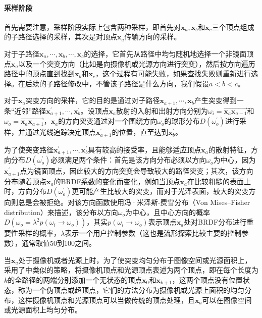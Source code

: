 \paragraph{采样阶段}
首先需要注意，采样阶段实际上包含两种采样，即首先对$\mathbf{x}_a,\mathbf{x}_b$和$\mathbf{x}_c$三个顶点组成的子路径选择的采样，其次是对顶点$\mathbf{x}_a$传输方向的采样。

对于子路径$\mathbf{x}_a,\cdots,\mathbf{x}_b,\cdots,\mathbf{x}_c$的选择，它首先从路径中均匀随机地选择一个非镜面顶点$\mathbf{x}_a$以及一个突变方向（比如是向摄像机或光源方向进行突变），然后按方向遍历路径中的顶点直到找到$\mathbf{x}_b$和$\mathbf{x}_c$，这个过程有可能失败，如果查找失败则重新进行选择。在后续的子路径修改中，不管该子路径是什么方向，我们假设$a<b<c$。

对于$\mathbf{x}_a$突变方向的采样，它的目的是通过对子路径$\mathbf{x}_{a+1},\cdots,\mathbf{x}_b$产生突变得到一条“近邻”路径$\mathbf{x}^{'}_{a+1},\cdots,\mathbf{x}^{'}_b$。设顶点$\mathbf{x}_a$散射的入射和出射方向分别为$\omega_i=\overrightarrow{\mathbf{x}_a\mathbf{x}_{a-1}}$和$\omega_o=\overrightarrow{\mathbf{x}_a\mathbf{x}_{a+1}}$，$\mathbf{x}_a$的方向突变通过对一个围绕方向$\omega_o$的球形分布$D(\omega^{'}_o)$进行采样，并通过光线追踪决定顶点$\mathbf{x}^{'}_{a+1}$的位置，直至达到$\mathbf{x}^{'}_b$。

为了使突变路径$\mathbf{x}^{'}_{a+1},\cdots,\mathbf{x}^{'}_b$具有较高的接受率，且能够适应顶点$\mathbf{x}_a$的散射特征，方向分布$D(\omega^{'}_o)$必须满足两个条件：首先是该方向分布必须以方向$\omega_o$为中心，因为$\mathbf{x}^{'}_{a+1}$点为镜面顶点，因此较大的方向突变会导致较大的路径突变；其次，该方向分布随着顶点$\mathbf{x}_a$的BRDF系数的变化而变化，例如当顶点$\mathbf{x}_a$在比较粗糙的表面上时，方向分布$D(\omega^{'}_o)$更可能产生比较大的突变，而对于光泽表面，较大的突变方向则总是会被拒绝。\cite{a:ManifoldExplorationAMarkovChainMonteCarloTechniqueforRenderingSceneswithDifficultSpecularTransport}对该方向函数使用冯·米泽斯-费雪分布（Von Mises–Fisher distribution）\cite{b:Directionalstatistics,b:Statisticalanalysisofsphericaldata}来描述，该分布以方向$\omega_o$为中心，且中心方向的概率$D(\omega_o=\lambda^{2}p(\omega_i\to\omega_o))$，其实$p(\omega_i\to\omega_o)$表示顶点$\mathbf{x}_a$处对BRDF分布进行重要性采样的概率，$\lambda$表示一个用户控制参数（这也是流形探索比较主要的控制参数），通常取值50到100之间。

当$\mathbf{x}_a$处于摄像机或者光源上时，为了使突变均匀分布于图像空间或光源面积上，\cite{a:ManifoldExplorationAMarkovChainMonteCarloTechniqueforRenderingSceneswithDifficultSpecularTransport}采用了\cite{a:MetropolisLightTransport}中类似的策略，将摄像机顶点和光源顶点表述为两个顶点，即在每个长度为$k$的全路径的两端分别添加一个无状态的顶点$\mathbf{x}_0$和$\mathbf{x}_{k+1}$，这两个顶点没有位置状态，称为一个伪顶点或超顶点，它们的方法分布为摄像机或光源上面积的均匀分布，这样摄像机顶点和光源顶点可以当做传统的顶点处理，且$\mathbf{x}_a$可以在图像空间或光源面积上均匀分布。




